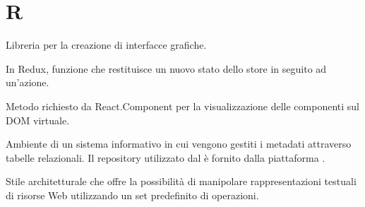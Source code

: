 \section{R}

Libreria  per la creazione di interfacce grafiche.

	In Redux, funzione che restituisce un nuovo stato dello store in seguito ad un'azione.

	Metodo richiesto da React.Component per la visualizzazione delle componenti sul DOM virtuale.

Ambiente di un sistema informativo in cui vengono gestiti i metadati attraverso
tabelle relazionali. Il repository utilizzato dal  \zephyrus{} è fornito
dalla piattaforma .

Stile architetturale che offre la possibilità di manipolare rappresentazioni testuali di risorse Web utilizzando un set predefinito di operazioni.

